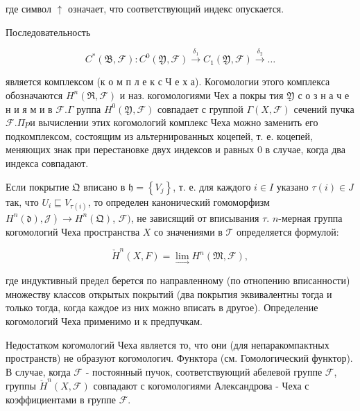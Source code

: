 \documentclass[10pt]{article}
\begin{document}
где символ $\uparrow$ означает, что соответствующий индекс опускается.



Последовательность



\[

C^{*}(\mathfrak{B}, \mathscr{F}): C^{0}(\mathfrak{Y}, \mathscr{F}) \stackrel{\delta_{1}}{\longrightarrow} C_{1}(\mathfrak{Y}, \mathscr{F}) \stackrel{\delta_{2}}{\longrightarrow} \ldots

\]



является комплексом (к о м п л е к с Ч е х а). Когомологии этого комплекса обозначаются $H^{n}(\mathfrak{R}, \mathscr{F})$ и наз. когомологиями Чех а покры тия $\mathfrak{Y}$ с о з н а ч е н и я м и в $\mathscr{F} . \Gamma$ руппа $H^{0}(\mathfrak{Y}, \mathscr{F})$ совпадает с группой $\Gamma(X, \mathscr{F})$ сечений пучка $\mathscr{F} . \Pi p и$ вычислении этих когомологий комплекс Чеха можно заменить его подкомплексом, состоящим из альтернированных коцепей, т. е. коцепей, меняющих знак при перестановке двух индексов и равных 0 в случае, когда два индекса совпадают.



Если покрытие $\mathfrak{Q}$ вписано в $\mathfrak{h}=\left\{V_{j}\right\}$, т. е. для каждого $i \in I$ указано $\tau(i) \in J$ так, что $U_{i} \sqsubseteq V_{\tau(i)}$, то определен канонический гомоморфизм $\left.H^{n}(\mathfrak{d}), \mathscr{J}\right) \rightarrow H^{n}(\mathfrak{Q})$, $\mathscr{F})$, не зависящий от вписывания $\tau$. $n$-мерная группа когомологий Чеха пространства $X$ со значениями в $\mathscr{T}$ определяется формулой:



\[

\check{H}^{n}(X, F)=\lim _{\longrightarrow} H^{n}(\mathfrak{M}, \mathscr{F}),

\]



где индуктивный предел берется по направленному (по отнопению вписанности) множеству классов открытых покрытий (два покрытия эквивалентны тогда и только тогда, когда каждое из них можно вписать в другое). Определение когомологий Чеха применимо и к предпучкам.



Недостатком когомологий Чеха является то, что они (для непаракомпактных пространств) не образуют когомологич. Функтора (см. Гомологический функтор). В случае, когда $\mathscr{F}$ - постоянный пучок, соответствующий абелевой группе $\mathscr{F}$, группы $\check{H}^{n}(X, \mathscr{F})$ совпадают с когомологиями Александрова - Чеха с коэффициентами в ғруппе $\mathscr{F}$.
\end{document}
